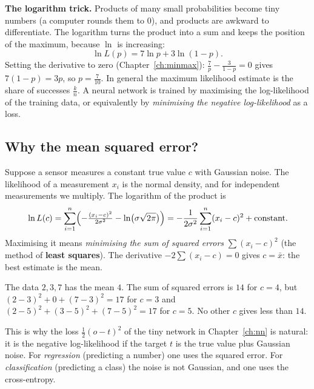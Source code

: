 \textbf{The logarithm trick.} Products of many small probabilities become tiny numbers (a computer rounds them to $0$), and products are awkward to differentiate. The logarithm turns the product into a sum and keeps the position of the maximum, because $\ln$ is increasing:
\[
\ln L(p)=7\ln p+3\ln(1-p).
\]
Setting the derivative to zero (Chapter~\ref{ch:minmax}): $\frac7p-\frac3{1-p}=0$ gives $7(1-p)=3p$, so $p=\frac7{10}$. In general the maximum likelihood estimate is the share of successes $\frac kn$. A neural network is trained by maximising the log-likelihood of the training data, or equivalently by \emph{minimising the negative log-likelihood} as a loss.

\subsection*{Why the mean squared error?}
Suppose a sensor measures a constant true value $c$ with Gaussian noise. The likelihood of a measurement $x_i$ is the normal density, and for independent measurements we multiply. The logarithm of the product is
\[
\ln L(c)=\sum_{i=1}^n\Bigl(-\tfrac{(x_i-c)^2}{2\sigma^2}-\ln\bigl(\sigma\sqrt{2\pi}\bigr)\Bigr)=-\frac1{2\sigma^2}\sum_{i=1}^n(x_i-c)^2+\text{constant}.
\]
Maximising it means \emph{minimising the sum of squared errors} $\sum(x_i-c)^2$ (the method of \textbf{least squares}). The derivative $-2\sum(x_i-c)=0$ gives $c=\bar x$: the best estimate is the mean.

\begin{example}
The data $2,3,7$ has the mean $4$. The sum of squared errors is $14$ for $c=4$, but $(2-3)^2+0+(7-3)^2=17$ for $c=3$ and $(2-5)^2+(3-5)^2+(7-5)^2=17$ for $c=5$. No other $c$ gives less than $14$.
\end{example}

This is why the loss $\frac12(o-t)^2$ of the tiny network in Chapter~\ref{ch:nn} is natural: it is the negative log-likelihood if the target $t$ is the true value plus Gaussian noise. For \emph{regression} (predicting a number) one uses the squared error. For \emph{classification} (predicting a class) the noise is not Gaussian, and one uses the cross-entropy.

